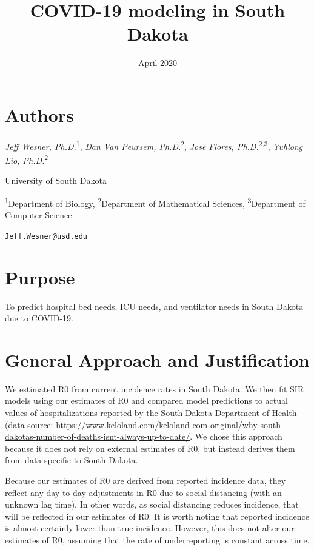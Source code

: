 \documentclass[
]{article}
\title{COVID-19 modeling in South Dakota}
\author{}
\date{\vspace{-2.5em}April 2020}
\begin{document}
\maketitle

\hypertarget{authors}{%
\section{Authors}\label{authors}}

\emph{Jeff Wesner, Ph.D.}\textsuperscript{1}, \emph{Dan Van Peursem,
Ph.D.}\textsuperscript{2}, \emph{Jose Flores,
Ph.D.}\textsuperscript{2,3}, \emph{Yuhlong Lio,
Ph.D.}\textsuperscript{2}

University of South Dakota

\textsuperscript{1}Department of Biology, \textsuperscript{2}Department
of Mathematical Sciences, \textsuperscript{3}Department of Computer
Science

\href{mailto:Jeff.Wesner@usd.edu}{\nolinkurl{Jeff.Wesner@usd.edu}}

\hypertarget{purpose}{%
\section{Purpose}\label{purpose}}

To predict hospital bed needs, ICU needs, and ventilator needs in South
Dakota due to COVID-19.

\hypertarget{general-approach-and-justification}{%
\section{General Approach and
Justification}\label{general-approach-and-justification}}

We estimated R0 from current incidence rates in South Dakota. We then
fit SIR models using our estimates of R0 and compared model predictions
to actual values of hospitalizations reported by the South Dakota
Department of Health (data source:
\url{https://www.keloland.com/keloland-com-original/why-south-dakotas-number-of-deaths-isnt-always-up-to-date/}.
We chose this approach because it does not rely on external estimates of
R0, but instead derives them from data specific to South Dakota.

Because our estimates of R0 are derived from reported incidence data,
they reflect any day-to-day adjustments in R0 due to social distancing
(with an unknown lag time). In other words, as social distancing reduces
incidence, that will be reflected in our estimates of R0. It is worth
noting that reported incidence is almost certainly lower than true
incidence. However, this does not alter our estimates of R0, assuming
that the rate of underreporting is constant across time.
\end{document}

